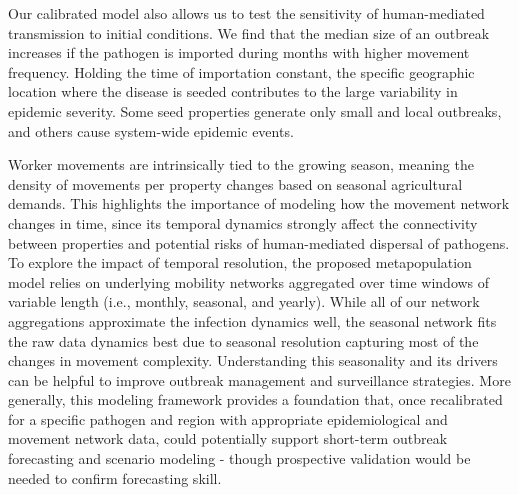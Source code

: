 \documentclass[aps,physrev,reprint,superscriptaddress]{revtex4-1}
\begin{document}
Our calibrated model also allows us to test the sensitivity of human-mediated transmission to initial conditions. We find that the median size of an outbreak increases if the pathogen is imported during months with higher movement frequency. Holding the time of importation constant, the specific geographic location where the disease is seeded contributes to the large variability in epidemic severity. Some seed properties generate only small and local outbreaks, and others cause system-wide epidemic events.  


Worker movements are intrinsically tied to the growing season, meaning the density of movements per property changes based on seasonal agricultural demands. This highlights the importance of modeling how the movement network changes in time, since its temporal dynamics strongly affect the connectivity between properties and potential risks of human-mediated dispersal of pathogens. To explore the impact of temporal resolution, the proposed metapopulation model relies on underlying mobility networks aggregated over time windows of variable length (i.e., monthly, seasonal, and yearly). While all of our network aggregations approximate the infection dynamics well, the seasonal network fits the raw data dynamics best due to seasonal resolution capturing most of the changes in movement complexity. Understanding this seasonality and its drivers can be helpful to improve outbreak management and surveillance strategies. More generally, this modeling framework provides a foundation that, once recalibrated for a specific pathogen and region with appropriate epidemiological and movement network data, could potentially support short-term outbreak forecasting and scenario modeling - though prospective validation would be needed to confirm forecasting skill.

\end{document}
